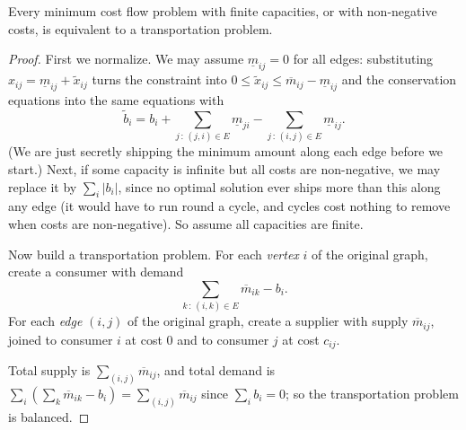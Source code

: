 \documentclass[a4paper]{scrartcl}
\begin{document}
\begin{theorem}
    Every minimum cost flow problem with finite capacities, or with non-negative costs, is equivalent to a transportation problem.
\end{theorem}
\begin{proof}
    First we normalize. We may assume $\underline m_{ij} = 0$ for all edges: substituting $x_{ij} = \underline m_{ij} + \tilde x_{ij}$ turns the constraint into $0 \leq \tilde x_{ij} \leq \overline m_{ij} - \underline m_{ij}$ and the conservation equations into the same equations with
    $$
    \tilde b_i = b_i + \sum_{j\,:\,(j,i)\in E}\underline m_{ji} - \sum_{j\,:\,(i,j)\in E}\underline m_{ij}.
    $$
    (We are just secretly shipping the minimum amount along each edge before we start.) Next, if some capacity is infinite but all costs are non-negative, we may replace it by $\sum_i|b_i|$, since no optimal solution ever ships more than this along any edge (it would have to run round a cycle, and cycles cost nothing to remove when costs are non-negative). So assume all capacities are finite.

    Now build a transportation problem. For each \emph{vertex} $i$ of the original graph, create a consumer with demand
    $$
    \sum_{k\,:\,(i,k)\in E}\overline m_{ik} - b_i.
    $$
    For each \emph{edge} $(i,j)$ of the original graph, create a supplier with supply $\overline m_{ij}$, joined to consumer $i$ at cost $0$ and to consumer $j$ at cost $c_{ij}$.
\begin{center}
\end{center}
    Total supply is $\sum_{(i,j)}\overline m_{ij}$, and total demand is $\sum_i\left(\sum_k \overline m_{ik} - b_i\right) = \sum_{(i,j)}\overline m_{ij}$ since $\sum_i b_i = 0$; so the transportation problem is balanced.


\end{proof}
\end{document}
